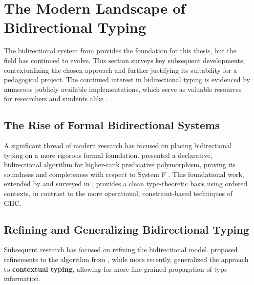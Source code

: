 \section{The Modern Landscape of Bidirectional Typing}
\label{chap:LiteratureReview:sec:TypeInferenceAlgorithm}

The bidirectional system from \cite{jones-practical-2007} provides the foundation for this thesis, but the field has continued to evolve. This section surveys key subsequent developments, contextualizing the chosen approach and further justifying its suitability for a pedagogical project. The continued interest in bidirectional typing is evidenced by numerous publicly available implementations, which serve as valuable resources for researchers and students alike \cite{github-goldenberg-artem-goldenbergbidirectionalsystem-2025, github-choi-kwanghoonbidi-2025, github-chen-cu1ch3ntype-inference-zoo-2025}.

\subsection{The Rise of Formal Bidirectional Systems}

A significant thread of modern research has focused on placing bidirectional typing on a more rigorous formal foundation. \citeauthor{dunfield-complete-2013} \cite{dunfield-complete-2013} presented a declarative, bidirectional algorithm for higher-rank predicative polymorphism, proving its soundness and completeness with respect to System F \cite{selinger-lecture-2013}. This foundational work, extended by \citeauthor{dunfield-sound-2019} \cite{dunfield-sound-2019} and surveyed in \cite{dunfield-bidirectional-2020}, provides a clean type-theoretic basis using ordered contexts, in contrast to the more operational, constraint-based techniques of GHC.

\subsection{Refining and Generalizing Bidirectional Typing}

Subsequent research has focused on refining the bidirectional model. \citeauthor{xie-higher-rank} \cite{xie-higher-rank} proposed refinements to the algorithm from \cite{dunfield-complete-2013}, while more recently, \citeauthor{xue-contextual-2024} \cite{xue-contextual-2024} generalized the approach to \textbf{contextual typing}, allowing for more fine-grained propagation of type information.

